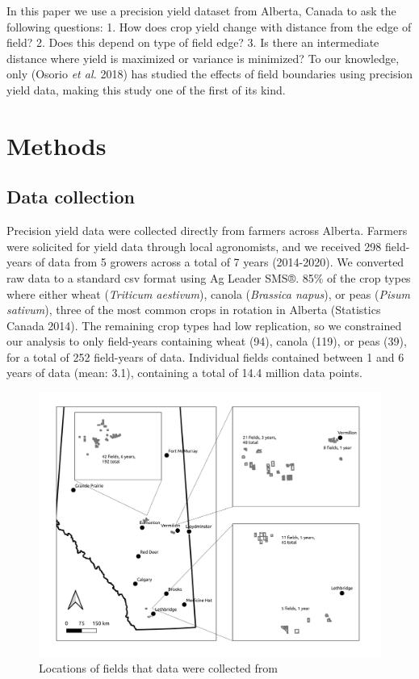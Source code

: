 \documentclass[]{elsarticle} %
\begin{document}
In this paper we use a precision yield dataset from Alberta, Canada to ask the following questions:
1. How does crop yield change with distance from the edge of field?
2. Does this depend on type of field edge?
3. Is there an intermediate distance where yield is maximized or variance is minimized?
To our knowledge, only (Osorio \emph{et al.} 2018) has studied the effects of field boundaries using precision yield data, making this study one of the first of its kind.

\hypertarget{methods}{%
\section{Methods}\label{methods}}

\hypertarget{data-collection}{%
\subsection{Data collection}\label{data-collection}}

Precision yield data were collected directly from farmers across Alberta.
Farmers were solicited for yield data through local agronomists, and we received 298 field-years of data from 5 growers across a total of 7 years (2014-2020).
We converted raw data to a standard csv format using Ag Leader SMS®.
85\% of the crop types where either wheat (\emph{Triticum aestivum}), canola (\emph{Brassica napus}), or peas (\emph{Pisum sativum}), three of the most common crops in rotation in Alberta (Statistics Canada 2014).
The remaining crop types had low replication, so we constrained our analysis to only field-years containing wheat (94), canola (119), or peas (39), for a total of 252 field-years of data.
Individual fields contained between 1 and 6 years of data (mean: 3.1), containing a total of 14.4 million data points.

\begin{figure}
\includegraphics[width=1\linewidth]{../Figures/Field Locations} \caption{Locations of fields that data were collected from}\label{fig:fieldLocataions}
\end{figure}
\end{document}
